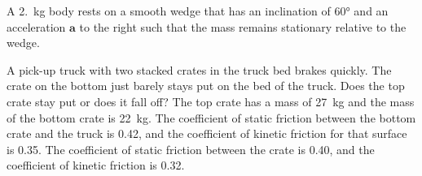 \documentclass{../../../oss-ap12ibhl-print}
\begin{document}
\begin{questions}
  \newpage
  
  \question A \SI{2.}{\kilo\gram} body rests on a smooth wedge that has an
  inclination of \ang{60} and an acceleration $\bm{a}$ to the right such that
  the mass remains stationary relative to the wedge.
  \begin{center}
  \end{center}
  \newpage
  
  \question A pick-up truck with two stacked crates in the truck bed brakes
  quickly. The crate on the bottom just barely stays put on the bed of the
  truck. Does the top crate stay put or does it fall off? The top crate has a
  mass of \SI{27}{\kilo\gram} and the mass of the bottom crate is
  \SI{22}{\kilo\gram}. The coefficient of static friction between the bottom
  crate and the truck is 0.42, and the coefficient of kinetic friction for that
  surface is 0.35. The coefficient of static friction between the crate is
  0.40, and the coefficient of kinetic friction is 0.32.
  \newpage
  
\end{questions}
\end{document}
